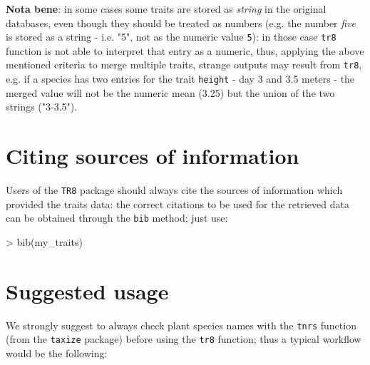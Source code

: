 \documentclass{article}
\begin{document}
\textbf{Nota bene}: in some cases some traits are stored as \textit{string} in the original databases, even though they should be treated as numbers (e.g. the number \textit{five} is stored as a string - i.e. "5", not as the numeric value \texttt{5}): in those case \texttt{tr8} function is not able to interpret that entry as a numeric, thus, applying the above mentioned criteria to merge multiple traits, strange outputs may result from \texttt{tr8}, e.g. if a species has two entries for the trait \texttt{height} - day 3 and 3.5 meters - the merged value will not be the numeric mean (3.25) but the union of the two strings ("3-3.5").
\section{Citing sources of information}
\label{sec:citing}

  Users of the \texttt{TR8} package should always cite the sources of information which provided the traits data: the correct citations to be used for the retrieved data can be obtained through the \texttt{bib} method; just use:
  

\begin{Schunk}
\begin{Sinput}
> bib(my_traits)
\end{Sinput}
\end{Schunk}

  
  
 \section{Suggested usage}

  We strongly suggest to always check plant species names with the
  \texttt{tnrs} function (from the \texttt{taxize} package) before
  using the \texttt{tr8} function; thus a typical workflow would be
  the following:
  
\end{document}
